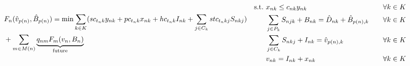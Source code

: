 \documentclass[10pt]{article}
\newcommand{\ti}{t} %
\newcommand{\ka}{k} %
\newcommand{\KA}{K}
\newcommand{\jey}{j} %
\newcommand{\Bi}{B} %
\newcommand{\Vi}{v} %
\newcommand{\Es}{S} %
\newcommand{\Zed}{z} %
\newcommand{\x}{x} %
\newcommand{\y}{y} %
\begin{document}
\begin{subequations}
\label{DynamicProgramming}
\begin{flalign}
&F_{n}(\hat{\Vi}_{p(n)},\hat{\Bi}_{p(n)}) =  \min  \sum_{\ka \in \KA} ( sc_{\ti_n \ka}\y_{n \ka} + pc_{\ti_n \ka}\x_{n \ka} + hc_{\ti_n \ka} {I}_{n \ka}+  \sum_{j\in C_{\ka }}stc_{\ti_n \ka \jey} \Es_{n  \ka \jey})& \notag \\ 
& + \sum_{m \in M(n)}  \underbrace{ q_{nm}F_{m}(\Vi_{n}, {\Bi_{n}}  ) }_{\text{future}} & \label{eq:Dyn_g2_Sub_ST_Production_Flow} 
\end{flalign}

\begin{flalign}
\text{s.t.} \ & \x_{n \ka} \leq c_{n \ka} \y_{n \ka} \quad  &\forall \ka  \in \KA  & \label{eq:Dyn_Sub_Setup}\\
& \sum_{j\in P_{k}} {S}_{n \jey \ka} + \Bi_{n  \ka}  = \hat{D}_{n \ka} + \hat{\Bi}_{p(n), \ka} \quad &\forall \ka  \in \KA \label{eq:Bhat} \\
& \sum_{j\in C_{k}} {S}_{n \ka \jey} + I_{n \ka} = \hat{\Vi}_{p(n), \ka}  \quad &\forall \ka  \in \KA \label{eq:vhat}\\
& \Vi_{n \ka} = I_{n  \ka} + \x_{n  \ka}  \quad &\forall \ka  \in \KA  \label{eq:vdef}

\end{flalign}
\end{subequations}
\end{document}
